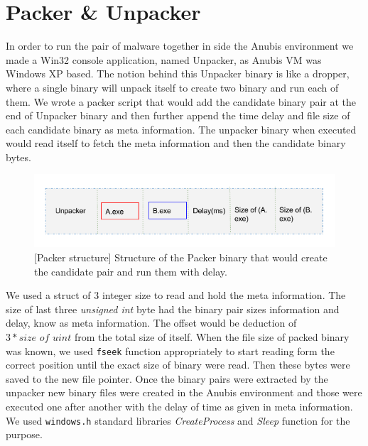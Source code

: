 \section{Packer \& Unpacker}
\label{sec:packerunpacker}
In order to run the pair of malware together in side the Anubis environment we made a Win32 console application, named Unpacker, as Anubis VM was Windows XP based. The notion behind this Unpacker binary is like a dropper, where a single binary will unpack itself to create two binary and run each of them.
We wrote a packer script that would add the candidate binary pair at the end of Unpacker binary and then further append the time delay and file size of each candidate binary as meta information.
The unpacker binary when executed would read itself to fetch the meta information and then the candidate binary bytes.\\
\begin{figure}[htbp]
  \centering
  \includegraphics[scale=0.5]{figures/unpacker.png}
\caption{[Packer structure] Structure of the Packer binary that would create the candidate pair and run them with delay.}
\label{fig:unpacker}
\end{figure}
We used a struct of 3 integer size to read and hold the meta information. The size of last three \textit{unsigned int} byte had the binary pair sizes information and delay, know as meta information. The offset would be deduction of $3 * \textit{size of uint}$ from the total size of itself. When the file size of packed binary was known, we used \texttt{fseek\(\)} function appropriately to start reading form the correct position until the exact size of binary were read. Then these bytes were saved to the new file pointer. Once the binary pairs were extracted by the unpacker new binary files were created in the Anubis environment and those were executed one after another with the delay of time as given in meta information. We used \texttt{windows.h} standard libraries \emph{CreateProcess} and \emph{Sleep} function for the purpose.\\

